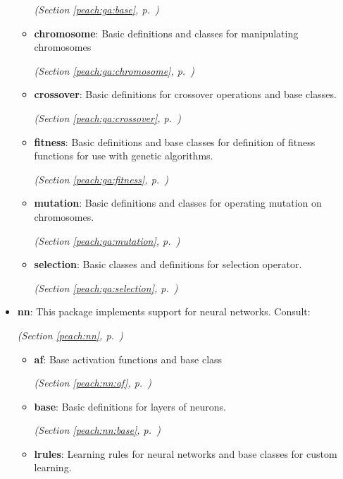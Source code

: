 \begin{itemize}
\begin{itemize}
  \textit{(Section \ref{peach:ga:base}, p.~\pageref{peach:ga:base})}

    \item \textbf{chromosome}: 
Basic definitions and classes for manipulating chromosomes


  \textit{(Section \ref{peach:ga:chromosome}, p.~\pageref{peach:ga:chromosome})}

    \item \textbf{crossover}: 
Basic definitions for crossover operations and base classes.


  \textit{(Section \ref{peach:ga:crossover}, p.~\pageref{peach:ga:crossover})}

    \item \textbf{fitness}: 
Basic definitions and base classes for definition of fitness functions for use
with genetic algorithms.


  \textit{(Section \ref{peach:ga:fitness}, p.~\pageref{peach:ga:fitness})}

    \item \textbf{mutation}: 
Basic definitions and classes for operating mutation on chromosomes.


  \textit{(Section \ref{peach:ga:mutation}, p.~\pageref{peach:ga:mutation})}

    \item \textbf{selection}: 
Basic classes and definitions for selection operator.


  \textit{(Section \ref{peach:ga:selection}, p.~\pageref{peach:ga:selection})}

  \end{itemize}
\item \textbf{nn}: 
This package implements support for neural networks. Consult:


  \textit{(Section \ref{peach:nn}, p.~\pageref{peach:nn})}

  \begin{itemize}
\setlength{\parskip}{0ex}
    \item \textbf{af}: 
Base activation functions and base class


  \textit{(Section \ref{peach:nn:af}, p.~\pageref{peach:nn:af})}

    \item \textbf{base}: 
Basic definitions for layers of neurons.


  \textit{(Section \ref{peach:nn:base}, p.~\pageref{peach:nn:base})}

    \item \textbf{lrules}: 
Learning rules for neural networks and base classes for custom learning.



\end{itemize}
\end{itemize}
